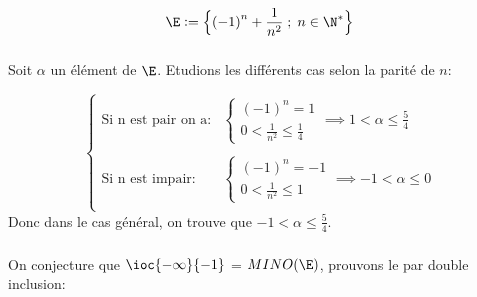\[ 
   \E:= \Bigl\{ {(-1)}^n + \frac{1}{n^2} \; ; \; n\in\N^* \Bigl\}
\]

\subsubsection*{}
Soit \(\alpha\) un élément de \(\E\). Etudions les différents cas selon la parité de $n$:

\[
   \begin{cases}
      \text{Si n est pair on a:}&      
         \begin{cases}
            {(-1)}^n = 1 \\
            0 < \frac{1}{n^2} \leq \frac{1}{4}
         \end{cases} \implies 1 < \alpha \leq \frac{5}{4} \\\\
      \text{Si n est impair:}&             
         \begin{cases}
            {(-1)}^n = -1 \\
            0 < \frac{1}{n^2} \leq 1
         \end{cases} \implies -1 < \alpha \leq 0\\
   \end{cases}
\]
Donc dans le cas général, on trouve que \(-1 < \alpha \leq \frac{5}{4}\).

\subsubsection*{}

On conjecture que $\ioc{-\infty}{-1}$ = $MINO(\E)$, prouvons le par double inclusion:

